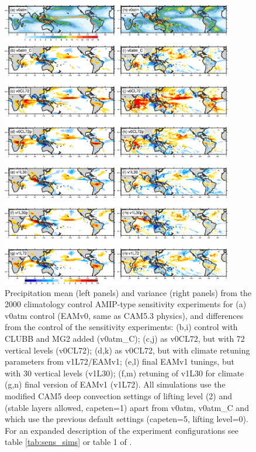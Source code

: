 \documentclass[draft,ms]{AGUTeX}
\begin{document}
\begin{article}
\begin{figure}[t]
  \begin{center}
  \noindent\includegraphics[width=0.9\textwidth,angle=0.]{./figs/f_sens_stats_PRECT_djf}
  \caption{\small{Precipitation mean (left panels) and variance (right panels) from the 2000 climatology control AMIP-type sensitivity experiments for (a) v0atm control (EAMv0, same as CAM5.3 physics), and differences from the control of the sensitivity experiments: (b,i) control with CLUBB and MG2 added (v0atm\_C); (c,j) as v0CL72, but with 72 vertical levels (v0CL72); (d,k) as v0CL72, but with climate retuning parameters from v1L72/EAMv1; (e,l) final EAMv1 tunings, but with 30 vertical levels (v1L30); (f,m) retuning of v1L30 for climate  (g,n) final version of EAMv1 (v1L72). All simulations use the modified CAM5 deep convection settings of lifting level (2) and (stable layers allowed, capeten=1) apart from v0atm, v0atm\_C and which use the previous default settings (capeten=5, lifting level=0). For an expanded description of the experiment configurations see table \ref{tab:sens_sims} or table 1 of \cite{Xie2018}.}} 
  \end{center}
\label{f_sens_stats_PRECT_djf}
\end{figure}


\end{article}
\end{document}
